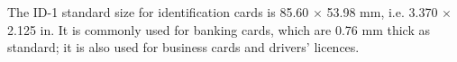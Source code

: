 The ID-1 standard size for identification cards is 85.60 \ensuremath{ \times } 53.98 mm, 
i.e. 3.370 \ensuremath{ \times } 2.125 in. It is commonly used for banking cards, which are
0.76 mm thick as standard; it is also used for business cards and drivers'
licences.